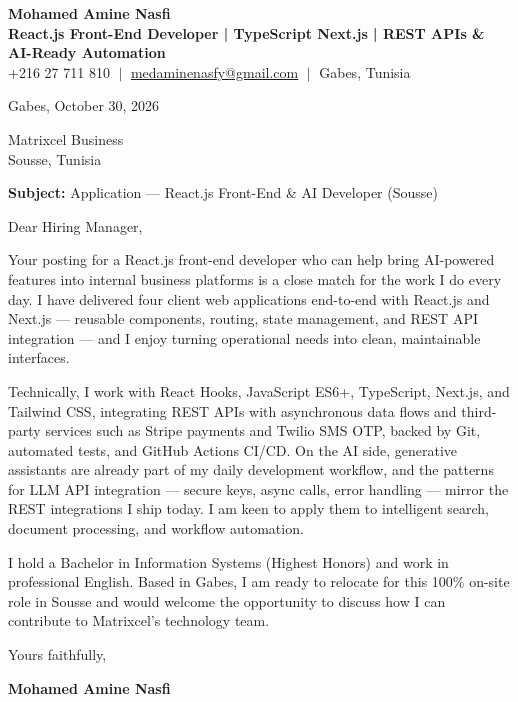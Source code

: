 \documentclass[11pt,a4paper]{article}
\begin{document}
\begin{center}
    \textbf{\Huge \color{navy} Mohamed Amine Nasfi} \\[3pt]
    \small \textbf{\color{accent} React.js Front-End Developer | TypeScript \textperiodcentered{} Next.js | REST APIs \& AI-Ready Automation} \\[3pt]
    \footnotesize \color{greytext}
    +216 27 711 810 $\;|\;$
    \href{mailto:medaminenasfy@gmail.com}{\underline{medaminenasfy@gmail.com}} $\;|\;$
    Gabes, Tunisia
\end{center}

\vspace{8pt}
\hfill Gabes, October 30, 2026

\vspace{12pt}
Matrixcel Business \\ Sousse, Tunisia

\vspace{10pt}
\textbf{Subject:} Application — React.js Front-End \& AI Developer (Sousse)

\vspace{4pt}
Dear Hiring Manager,

Your posting for a React.js front-end developer who can help bring AI-powered features into internal business platforms is a close match for the work I do every day. I have delivered four client web applications end-to-end with React.js and Next.js — reusable components, routing, state management, and REST API integration — and I enjoy turning operational needs into clean, maintainable interfaces.

Technically, I work with React Hooks, JavaScript ES6+, TypeScript, Next.js, and Tailwind CSS, integrating REST APIs with asynchronous data flows and third-party services such as Stripe payments and Twilio SMS OTP, backed by Git, automated tests, and GitHub Actions CI/CD. On the AI side, generative assistants are already part of my daily development workflow, and the patterns for LLM API integration — secure keys, async calls, error handling — mirror the REST integrations I ship today. I am keen to apply them to intelligent search, document processing, and workflow automation.

I hold a Bachelor in Information Systems (Highest Honors) and work in professional English. Based in Gabes, I am ready to relocate for this 100\% on-site role in Sousse and would welcome the opportunity to discuss how I can contribute to Matrixcel's technology team.

Yours faithfully,

\vspace{14pt}
\hfill \textbf{Mohamed Amine Nasfi}
\end{document}

